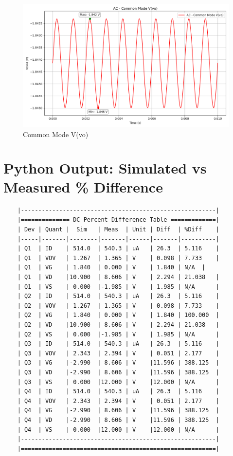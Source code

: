 \begin{figure}
    \centering
    \includegraphics[width=0.95\linewidth]{Chapter_7/Lab_07_AC_CommonMode_vo_Plot.png}
    \caption{Common Mode V(vo)}
    \label{Ch7_fig:3}
\end{figure}
\clearpage

%
\section{Python	Output: Simulated vs Measured \% Difference}
\vspace{0.25cm}
\begin{verbatim}
	|--------------------------------------------------------|
	|============== DC Percent Difference Table =============|
	| Dev | Quant |  Sim   | Meas  | Unit | Diff  | %Diff    |
	|-----|-------|--------|-------|------|-------|----------|
	| Q1  | ID    | 514.0  | 540.3 | uA   | 26.3  | 5.116    |
	| Q1  | VOV   | 1.267  | 1.365 | V    | 0.098 | 7.733    |
	| Q1  | VG    | 1.840  | 0.000 | V    | 1.840 | N/A  |
	| Q1  | VD    |10.900  | 8.606 | V    | 2.294 | 21.038   |
	| Q1  | VS    | 0.000  |-1.985 | V    | 1.985 | N/A      |
	| Q2  | ID    | 514.0  | 540.3 | uA   | 26.3  | 5.116    |
	| Q2  | VOV   | 1.267  | 1.365 | V    | 0.098 | 7.733    |
	| Q2  | VG    | 1.840  | 0.000 | V    | 1.840 | 100.000  |
	| Q2  | VD    |10.900  | 8.606 | V    | 2.294 | 21.038   |
	| Q2  | VS    | 0.000  |-1.985 | V    | 1.985 | N/A      |
	| Q3  | ID    | 514.0  | 540.3 | uA   | 26.3  | 5.116    |
	| Q3  | VOV   | 2.343  | 2.394 | V    | 0.051 | 2.177    |
	| Q3  | VG    |-2.990  | 8.606 | V    |11.596 | 388.125  |
	| Q3  | VD    |-2.990  | 8.606 | V    |11.596 | 388.125  |
	| Q3  | VS    | 0.000  |12.000 | V    |12.000 | N/A      |
	| Q4  | ID    | 514.0  | 540.3 | uA   | 26.3  | 5.116    |
	| Q4  | VOV   | 2.343  | 2.394 | V    | 0.051 | 2.177    |
	| Q4  | VG    |-2.990  | 8.606 | V    |11.596 | 388.125  |
	| Q4  | VD    |-2.990  | 8.606 | V    |11.596 | 388.125  |
	| Q4  | VS    | 0.000  |12.000 | V    |12.000 | N/A      |
	|--------------------------------------------------------|
	|========================================================|
\end{verbatim}

